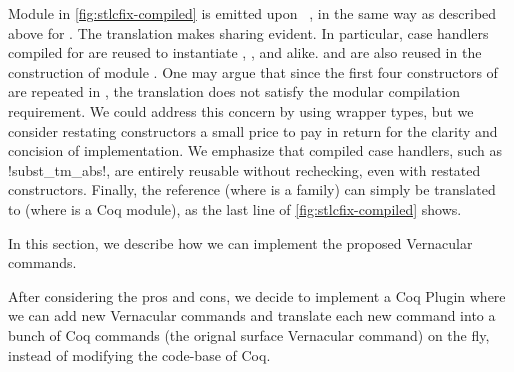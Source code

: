 Module  in \cref{fig:stlcfix-compiled} is emitted upon
~, in the same way as described above for .
The translation makes sharing evident.
In particular, case handlers compiled for 
are reused to instantiate , , and alike.
 and 
are also reused in the construction of module .
%
One may argue that since the first four constructors of  are
repeated in , the translation does not satisfy the
modular compilation requirement.
We could address this concern by using wrapper types,
but we consider restating constructors a small price to pay in return
for the clarity and concision of implementation.
We emphasize that compiled case handlers, such as \lsti!subst\_tm_abs!,
are entirely reusable without rechecking, even with restated constructors.
%
Finally, the reference  (where  is a family)
can simply be translated to  (where  is a Coq module),
as the last line of \cref{fig:stlcfix-compiled} shows.

\ifShowOldWriting

\newpage

In this section, we describe how we can implement the proposed Vernacular commands.

After considering the pros and cons, we decide to implement a Coq Plugin where we can add new Vernacular commands and translate each new command into a bunch of Coq commands (the orignal surface Vernacular command) on the fly, instead of modifying the code-base of Coq. 

